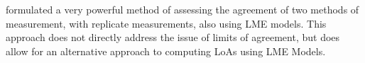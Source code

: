 \documentclass[12pt, a4paper]{report}
\theoremstyle{plain}
\theoremstyle{definition}
\theoremstyle{remark}
\begin{document}
		
	\citet{ARoy2009} formulated a very powerful method of assessing the agreement of two methods of measurement, with replicate measurements, also using LME models. This approach does not directly address the issue of limits of agreement, but does allow for an alternative approach to computing LoAs using LME Models.
	
	
	
	
\end{document}
